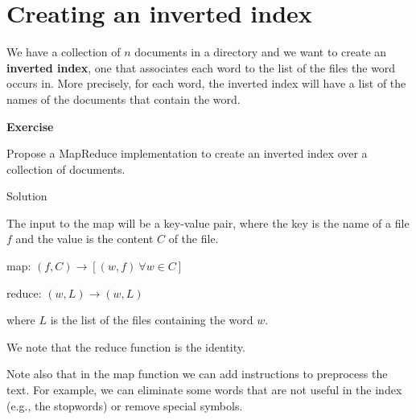 \documentclass[
]{article}
\newenvironment{infobox}[1]
  {
  \begin{itemize}
  \renewcommand{\labelitemi}{
    \raisebox{-.7\height}[0pt][0pt]{
      
    }
  }
  \setlength{\fboxsep}{1em}
  \begin{whitebox}
  \item
  }
  {
  \end{whitebox}
  \end{itemize}
  }
\theoremstyle{definition}
\theoremstyle{definition}
\theoremstyle{definition}
\theoremstyle{remark}
\let\BeginKnitrBlock\begin \let\EndKnitrBlock\end
\begin{document}
\hypertarget{creating-an-inverted-index}{%
\section{Creating an inverted index}\label{creating-an-inverted-index}}

We have a collection of \(n\) documents in a directory and we want to create
an \textbf{inverted index}, one that associates each word
to the list of the files the word occurs in.
More precisely, for each word, the inverted index will
have a list of the names of the documents that contain the word.

\begin{infobox}{exercisebox}

\textbf{Exercise}

\BeginKnitrBlock{exercise}
\protect\hypertarget{exr:unnamed-chunk-8}{}{\label{exr:unnamed-chunk-8} }
Propose a MapReduce implementation to create an inverted index over a
collection of documents.
\EndKnitrBlock{exercise}

\end{infobox}

Solution

\begin{infobox}{exercisebox}

The input to the map will be a key-value pair, where
the key is the name of a file \(f\) and the value is the
content \(C\) of the file.

map: \((f, C) \rightarrow [(w, f)\ \forall w \in C]\)

reduce: \((w, L) \rightarrow (w, L)\)

where \(L\) is the list of the files containing the word \(w\).

We note that the reduce function is the identity.

Note also that in the map function we can add instructions
to preprocess the text. For example, we can eliminate some words
that are not useful in the index (e.g., the stopwords) or remove
special symbols.

\end{infobox}
\end{document}
